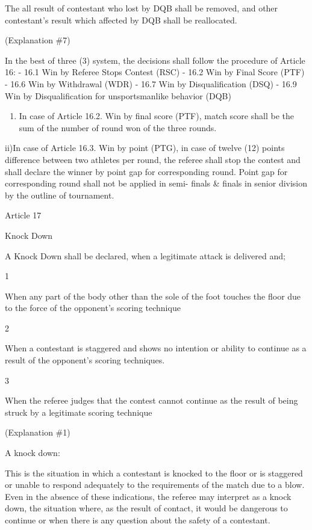 \documentclass[
]{report}
\providecommand{\tightlist}{%
  \setlength{\itemsep}{0pt}\setlength{\parskip}{0pt}}
\renewcommand{\labelenumi}{\arabic{enumi}}
\begin{document}
The all result of contestant who lost by DQB shall be removed, and other
contestant's result which affected by DQB shall be reallocated.

(Explanation \#7)

In the best of three (3) system, the decisions shall follow the
procedure of Article 16: - 16.1 Win by Referee Stops Contest (RSC) -
16.2 Win by Final Score (PTF) - 16.6 Win by Withdrawal (WDR) - 16.7 Win
by Disqualification (DSQ) - 16.9 Win by Disqualification for
unsportsmanlike behavior (DQB)

\begin{enumerate}
\def\labelenumi{\roman{enumi})}
\tightlist
\item
  In case of Article 16.2. Win by final score (PTF), match score shall
  be the sum of the number of round won of the three rounds.
\end{enumerate}

ii)In case of Article 16.3. Win by point (PTG), in case of twelve (12)
points difference between two athletes per round, the referee shall stop
the contest and shall declare the winner by point gap for corresponding
round. Point gap for corresponding round shall not be applied in semi-
finals \& finals in senior division by the outline of tournament.

Article 17

Knock Down

A Knock Down shall be declared, when a legitimate attack is delivered
and;

1

When any part of the body other than the sole of the foot touches the
floor due to the force of the opponent's scoring technique

2

When a contestant is staggered and shows no intention or ability to
continue as a result of the opponent's scoring techniques.

3

When the referee judges that the contest cannot continue as the result
of being struck by a legitimate scoring technique

(Explanation \#1)

A knock down:

This is the situation in which a contestant is knocked to the floor or
is staggered or unable to respond adequately to the requirements of the
match due to a blow. Even in the absence of these indications, the
referee may interpret as a knock down, the situation where, as the
result of contact, it would be dangerous to continue or when there is
any question about the safety of a contestant.
\end{document}
